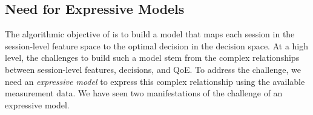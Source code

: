 \subsection{Need for Expressive Models}
\label{subsec:overview:challenge1}

The algorithmic objective of \ddn is to build a model that maps each 
session in the session-level feature space to the optimal decision in 
the decision space. 
At a high level, the challenges to build such a model stem from the complex 
relationships between session-level features, decisions, and QoE.
To address the challenge, we need an {\em expressive model} to express this complex 
relationship using the available measurement data.
We have seen two manifestations of the challenge of an expressive model.

